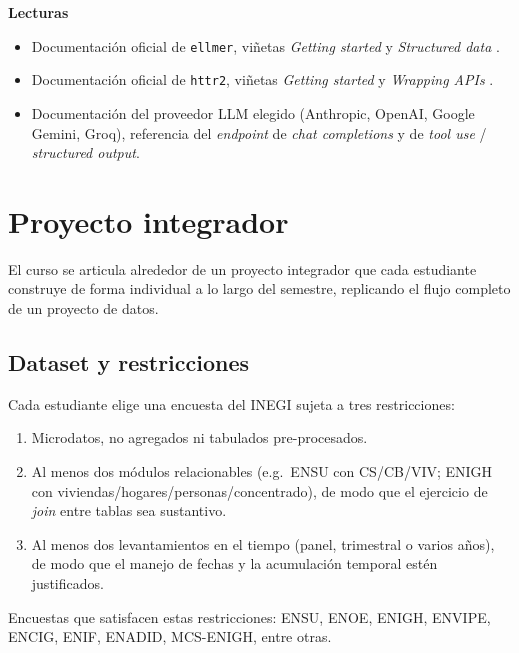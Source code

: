 \documentclass[11pt,letterpaper]{article}
\begin{document}
\medskip
\noindent\textbf{Lecturas}
\begin{itemize}[leftmargin=*, itemsep=1pt]
    \item Documentación oficial de \texttt{ellmer}, viñetas \textit{Getting started} y \textit{Structured data} \cite{wickham-ellmer}.
    \item Documentación oficial de \texttt{httr2}, viñetas \textit{Getting started} y \textit{Wrapping APIs} \cite{wickham-httr2}.
    \item Documentación del proveedor LLM elegido (Anthropic, OpenAI, Google Gemini, Groq), referencia del \textit{endpoint} de \textit{chat completions} y de \textit{tool use} / \textit{structured output}.
\end{itemize}

\section{Proyecto integrador}

El curso se articula alrededor de un proyecto integrador que cada estudiante construye de forma individual a lo largo del semestre, replicando el flujo completo de un proyecto de datos.

\subsection*{Dataset y restricciones}

Cada estudiante elige una encuesta del INEGI sujeta a tres restricciones:

\begin{enumerate}[leftmargin=*, itemsep=1pt]
    \item Microdatos, no agregados ni tabulados pre-procesados.
    \item Al menos dos módulos relacionables (e.g.\ ENSU con CS/CB/VIV; ENIGH con viviendas/hogares/personas/concentrado), de modo que el ejercicio de \textit{join} entre tablas sea sustantivo.
    \item Al menos dos levantamientos en el tiempo (panel, trimestral o varios años), de modo que el manejo de fechas y la acumulación temporal estén justificados.
\end{enumerate}

Encuestas que satisfacen estas restricciones: ENSU, ENOE, ENIGH, ENVIPE, ENCIG, ENIF, ENADID, MCS-ENIGH, entre otras.
\end{document}
